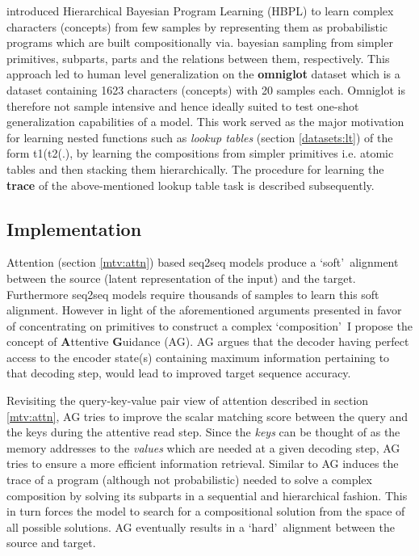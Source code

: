 \cite{Lake2015} introduced Hierarchical Bayesian Program Learning (HBPL) to learn complex characters (concepts) from few samples by representing them as probabilistic programs which are built compositionally via. bayesian sampling from simpler primitives, subparts, parts and the relations between them, respectively. This approach led to human level generalization on the \textbf{omniglot} dataset \citep{Lake2015} which is a dataset containing 1623 characters (concepts) with 20 samples each. Omniglot is therefore not sample intensive and hence ideally suited to test one-shot generalization capabilities of a model. This work served as the major motivation for learning nested functions such as \textit{lookup tables} (section \ref{datasets:lt}) of the form t1(t2(.), by learning the compositions from simpler primitives i.e. atomic tables and then stacking them hierarchically. The procedure for learning the \textbf{trace} of the above-mentioned lookup table task is described subsequently.

\subsection{Implementation}

Attention (section \ref{mtv:attn}) based seq2seq models produce a \lq soft{}\rq\ alignment between the source (latent representation of the input) and the target. Furthermore seq2seq models require thousands of samples to learn this soft alignment. However in light of the aforementioned arguments presented in favor of concentrating on primitives to construct a complex \lq composition{}\rq\ I propose the concept of \textbf{A}ttentive \textbf{G}uidance (AG). AG argues that the decoder having perfect access to the encoder state(s) containing maximum information pertaining to that decoding step, would lead to improved target sequence accuracy.


Revisiting the query-key-value pair view of attention described in section \ref{mtv:attn}, AG tries to improve the scalar matching score between the query and the keys during the attentive read step. Since the \textit{keys} can be thought of as the memory addresses to the \textit{values} which are needed at a given decoding step, AG tries to ensure a more efficient information retrieval. Similar to \cite{Lake2015} AG induces the trace of a program (although not probabilistic) needed to solve a complex composition by solving its subparts in a sequential and hierarchical fashion. This in turn forces the model to search for a compositional solution from the space of all possible solutions. AG eventually results in a \lq hard{}\rq\ alignment between the source and target.


